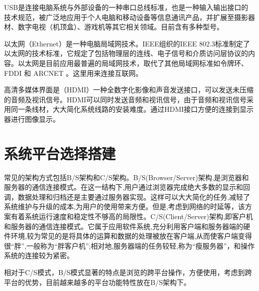 USB是连接电脑系统与外部设备的一种串口总线标准，也是一种输入输出接口的技术规范，被广泛地应用于个人电脑和移动设备等信息通讯产品，并扩展至摄影器材、数字电视（机顶盒）、游戏机等其它相关领域。目前含有多种型号。

以太网（Ethernet）是一种电脑局域网技术。IEEE组织的IEEE 802.3标准制定了以太网的技术标准，它规定了包括物理层的连线、电子信号和介质访问层协议的内容。以太网是目前应用最普遍的局域网技术，取代了其他局域网标准如令牌环、 FDDI 和 ARCNET 。这里用来连接互联网。

高清多媒体界面是（HDMI）一种全数字化影像和声音发送接口，可以发送未压缩的音频及视讯信号。HDMI可以同时发送音频和视讯信号，由于音频和视讯信号采用同一条线材，大大简化系统线路的安装难度。通过HDMI接口方便的连接到显示器进行图像显示。



\section{系统平台选择搭建}
常见的架构方式包括B/S架构和C/S架构。B/S(Browser/Server)架构,是浏览器和服务器的通信连接模式。在这一结构下,用户通过浏览器完成绝大多数的显示和回调，数据处理和归档还是主要通过服务器实现。这样可以大大简化的任务,减轻了系统维护与升级的成本,为用户的使用带来方便。但是,考虑到网络的时延等，该方案有着系统运行速度和稳定性不够高的局限性。C/S(Client/Server)架构,即客户机和服务器的通信连接模式。它属于应用软件系统,充分利用客户端和服务器端的硬件环境,较为常见的是将具体的运算和数据的处理被放在客户端,从而使客户端变得很“胖”,一般称为“胖客户机”;相对地,服务器端的任务较轻,称为“瘦服务器”，和操作系统的连接较为紧密\cite{bscs}。

相对于C/S模式，B/S模式显著的特点是浏览的跨平台操作，方便使用，考虑到跨平台的优势，目前越来越多的平台功能特性放在B/S架构下\cite{bshome}。